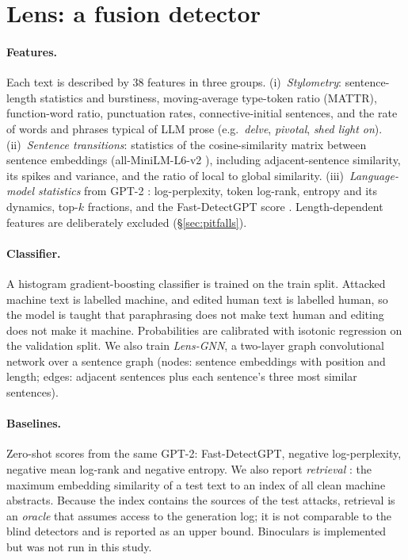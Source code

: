 \documentclass[11pt]{article}
\begin{document}
\section{Lens: a fusion detector}
\label{sec:lens}

\paragraph{Features.}
Each text is described by 38 features in three groups.
(i)~\emph{Stylometry}: sentence-length statistics and burstiness, moving-average type-token ratio (MATTR), function-word ratio, punctuation rates, connective-initial sentences, and the rate of words and phrases typical of LLM prose (e.g.\ \emph{delve}, \emph{pivotal}, \emph{shed light on}).
(ii)~\emph{Sentence transitions}: statistics of the cosine-similarity matrix between sentence embeddings (all-MiniLM-L6-v2 \citep{reimers2019sbert,wang2020minilm}), including adjacent-sentence similarity, its spikes and variance, and the ratio of local to global similarity.
(iii)~\emph{Language-model statistics} from GPT-2 \citep{radford2019gpt2}: log-perplexity, token log-rank, entropy and its dynamics, top-$k$ fractions, and the Fast-DetectGPT score \citep{bao2024fastdetectgpt}.
Length-dependent features are deliberately excluded (\S\ref{sec:pitfalls}).

\paragraph{Classifier.}
A histogram gradient-boosting classifier is trained on the train split.
Attacked machine text is labelled machine, and edited human text is labelled human, so the model is taught that paraphrasing does not make text human and editing does not make it machine.
Probabilities are calibrated with isotonic regression \citep{zadrozny2002isotonic} on the validation split.
We also train \emph{Lens-GNN}, a two-layer graph convolutional network \citep{kipf2017gcn} over a sentence graph (nodes: sentence embeddings with position and length; edges: adjacent sentences plus each sentence's three most similar sentences).

\paragraph{Baselines.}
Zero-shot scores from the same GPT-2: Fast-DetectGPT, negative log-perplexity, negative mean log-rank and negative entropy.
We also report \emph{retrieval} \citep{krishna2023paraphrasing}: the maximum embedding similarity of a test text to an index of all clean machine abstracts.
Because the index contains the sources of the test attacks, retrieval is an \emph{oracle} that assumes access to the generation log; it is not comparable to the blind detectors and is reported as an upper bound.
Binoculars is implemented but was not run in this study.
\end{document}
